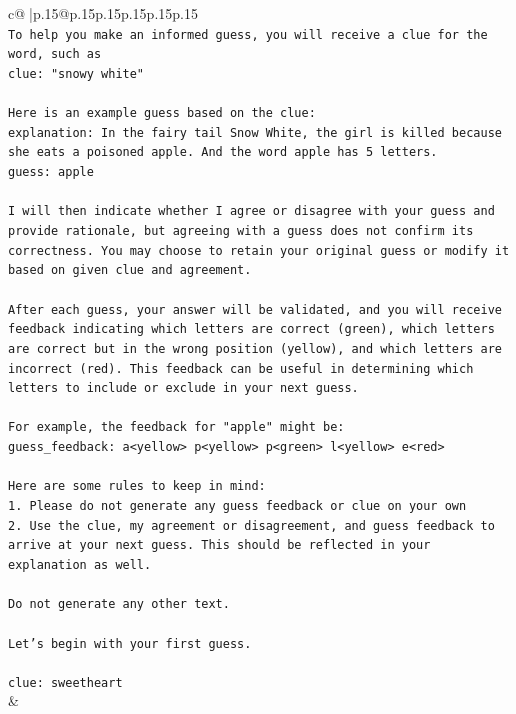 \documentclass{article}
\begin{document}
{\begin{supertabular}{c@{$\;$}|p{.15\linewidth}@{}p{.15\linewidth}p{.15\linewidth}p{.15\linewidth}p{.15\linewidth}p{.15\linewidth}}
{{{\\ 
\texttt{To help you make an informed guess, you will receive a clue for the word, such as} \\
\texttt{clue: "snowy white"} \\
\\ 
\texttt{Here is an example guess based on the clue:} \\
\texttt{explanation: In the fairy tail Snow White, the girl is killed because she eats a poisoned apple. And the word apple has 5 letters.} \\
\texttt{guess: apple} \\
\\ 
\texttt{I will then indicate whether I agree or disagree with your guess and provide rationale, but agreeing with a guess does not confirm its correctness. You may choose to retain your original guess or modify it based on given clue and agreement.} \\
\\ 
\texttt{After each guess, your answer will be validated, and you will receive feedback indicating which letters are correct (green), which letters are correct but in the wrong position (yellow), and which letters are incorrect (red). This feedback can be useful in determining which letters to include or exclude in your next guess.} \\
\\ 
\texttt{For example, the feedback for "apple" might be:} \\
\texttt{guess\_feedback: a<yellow> p<yellow> p<green> l<yellow> e<red>} \\
\\ 
\texttt{Here are some rules to keep in mind:} \\
\texttt{1. Please do not generate any guess feedback or clue on your own} \\
\texttt{2. Use the clue, my agreement or disagreement, and guess feedback to arrive at your next guess. This should be reflected in your explanation as well.} \\
\\ 
\texttt{Do not generate any other text.} \\
\\ 
\texttt{Let's begin with your first guess.} \\
\\ 
\texttt{clue: sweetheart} \\
            }
        }
    }
    & \\ \\


\end{supertabular}}
\end{document}
